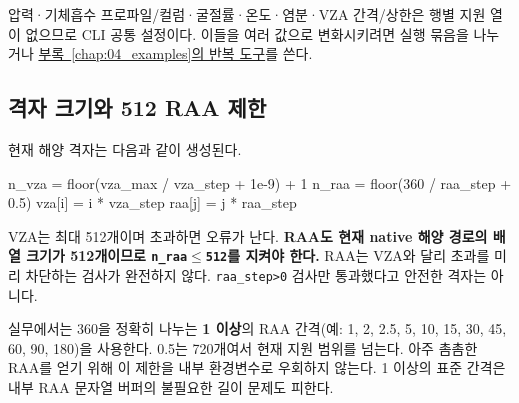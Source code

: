 압력·기체흡수 프로파일/컬럼·굴절률·온도·염분·VZA 간격/상한은 행별 지원 열이 없으므로 CLI 공통 설정이다. 이들을 여러 값으로 변화시키려면 실행 묶음을 나누거나 \hyperref[chap:04_examples]{부록~\ref*{chap:04_examples}의 반복 도구}를 쓴다.

\subsection{격자 크기와 512 RAA 제한}
\label{sec:auto:08_input_formats:2.5}
현재 해양 격자는 다음과 같이 생성된다.


\begin{ManualCode}
n_vza = floor(vza_max / vza_step + 1e-9) + 1
n_raa = floor(360 / raa_step + 0.5)
vza[i] = i * vza_step
raa[j] = j * raa_step
\end{ManualCode}

VZA는 최대 512개이며 초과하면 오류가 난다. \textbf{RAA도 현재 native 해양 경로의 배열 크기가 512개이므로 \texttt{n\_\allowbreak{}raa\ensuremath{\leq}512}를 지켜야 한다.} RAA는 VZA와 달리 초과를 미리 차단하는 검사가 완전하지 않다. \texttt{raa\_\allowbreak{}step>0} 검사만 통과했다고 안전한 격자는 아니다.

실무에서는 360을 정확히 나누는 \textbf{1\textdegree{} 이상}의 RAA 간격(예: 1, 2, 2.5, 5, 10, 15, 30, 45, 60, 90, 180\textdegree{})을 사용한다. 0.5\textdegree{}는 720개여서 현재 지원 범위를 넘는다. 아주 촘촘한 RAA를 얻기 위해 이 제한을 내부 환경변수로 우회하지 않는다. 1\textdegree{} 이상의 표준 간격은 내부 RAA 문자열 버퍼의 불필요한 길이 문제도 피한다.

